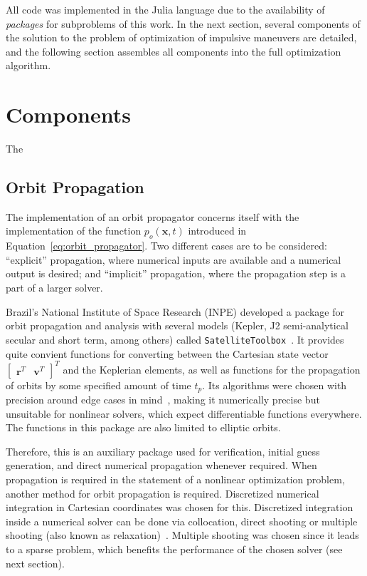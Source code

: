 
All code was implemented in the Julia language due to the availability of \textit{packages} for subproblems of this work. In the next section, several components of the solution to the problem of optimization of impulsive maneuvers are detailed, and the following section assembles all components into the full optimization algorithm.

\section{Components}

The 

\subsection{Orbit Propagation}\label{sec:orbit_propagation}

The implementation of an orbit propagator concerns itself with the implementation of the function \(p_o(\mathbf{x}, t)\) introduced in Equation~\eqref{eq:orbit_propagator}. Two different cases are to be considered: ``explicit'' propagation, where numerical inputs are available and a numerical output is desired; and ``implicit'' propagation, where the propagation step is a part of a larger solver.

Brazil's National Institute of Space Research (INPE) developed a package for orbit propagation and analysis with several models (Kepler, J2 semi-analytical secular and short term, among others) called \texttt{SatelliteToolbox}~\cite{satellitetoolbox}. It provides quite convient functions for converting between the Cartesian state vector \(\begin{bmatrix}
    \mathbf{r}^T & \mathbf{v}^T
\end{bmatrix}^T\) and the Keplerian elements, as well as functions for the propagation of orbits by some specified amount of time \(t_p\). Its algorithms were chosen with precision around edge cases in mind~\cite{rv_to_kepler}, making it numerically precise but unsuitable for nonlinear solvers, which expect differentiable functions everywhere. The functions in this package are also limited to elliptic orbits.

Therefore, this is an auxiliary package used for verification, initial guess generation, and direct numerical propagation whenever required. When propagation is required in the statement of a nonlinear optimization problem, another method for orbit propagation is required. Discretized numerical integration in Cartesian coordinates was chosen for this. Discretized integration inside a numerical solver can be done via collocation, direct shooting or multiple shooting (also known as relaxation)~\cite{numerical_recipes}. Multiple shooting was chosen since it leads to a sparse problem, which benefits the performance of the chosen solver (see next section).

